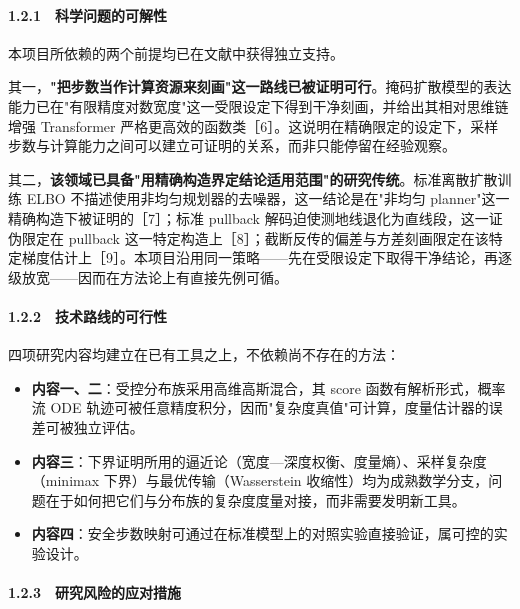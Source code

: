 \documentclass[12pt,a4paper]{ctexart}
\begin{document}
\paragraph{1.2.1　科学问题的可解性}

本项目所依赖的两个前提均已在文献中获得独立支持。

其一，\textbf{"把步数当作计算资源来刻画"这一路线已被证明可行}。掩码扩散模型的表达能力已在"有限精度对数宽度"这一受限设定下得到干净刻画，并给出其相对思维链增强 Transformer 严格更高效的函数类［6］。这说明在精确限定的设定下，采样步数与计算能力之间可以建立可证明的关系，而非只能停留在经验观察。

其二，\textbf{该领域已具备"用精确构造界定结论适用范围"的研究传统}。标准离散扩散训练 ELBO 不描述使用非均匀规划器的去噪器，这一结论是在"非均匀 planner"这一精确构造下被证明的［7］；标准 pullback 解码迫使测地线退化为直线段，这一证伪限定在 pullback 这一特定构造上［8］；截断反传的偏差与方差刻画限定在该特定梯度估计上［9］。本项目沿用同一策略——先在受限设定下取得干净结论，再逐级放宽——因而在方法论上有直接先例可循。

\paragraph{1.2.2　技术路线的可行性}

四项研究内容均建立在已有工具之上，不依赖尚不存在的方法：

\begin{itemize}[leftmargin=2em,itemsep=2pt,topsep=3pt]
  \item \textbf{内容一、二}：受控分布族采用高维高斯混合，其 score 函数有解析形式，概率流 ODE 轨迹可被任意精度积分，因而"复杂度真值"可计算，度量估计器的误差可被独立评估。
  \item \textbf{内容三}：下界证明所用的逼近论（宽度—深度权衡、度量熵）、采样复杂度（minimax 下界）与最优传输（Wasserstein 收缩性）均为成熟数学分支，问题在于如何把它们与分布族的复杂度度量对接，而非需要发明新工具。
  \item \textbf{内容四}：安全步数映射可通过在标准模型上的对照实验直接验证，属可控的实验设计。
\end{itemize}

\paragraph{1.2.3　研究风险的应对措施}
\end{document}

